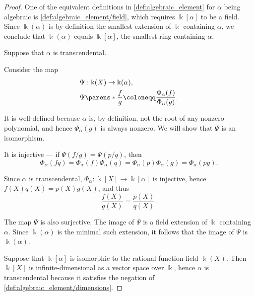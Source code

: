 \begin{proof}
   One of the equivalent definitions in \cref{def:algebraic_element} for \( \alpha \) being algebraic is \cref{def:algebraic_element/field}, which requires \( \Bbbk[\alpha] \) to be a field. Since \( \Bbbk(\alpha) \) is by definition the smallest extension of \( \Bbbk \) containing \( \alpha \), we conclude that \( \Bbbk(\alpha) \) equals \( \Bbbk[\alpha] \), the smallest ring containing \( \alpha \).


  \SufficiencySubProof* Suppose that \( \alpha \) is transcendental.

  Consider the map
  \begin{equation*}
    \begin{aligned}
      &\Psi: \Bbbk(X) \to \Bbbk(\alpha), \\
      &\Psi\parens*{ \frac f g } \coloneqq \frac {\Phi_\alpha(f)} {\Phi_\alpha(g)}.
    \end{aligned}
  \end{equation*}

  It is well-defined because \( \alpha \) is, by definition, not the root of any nonzero polynomial, and hence \( \Phi_\alpha(g) \) is always nonzero. We will show that \( \Psi \) is an isomorphism.

  It is injective --- if \( \Psi(f / g) = \Psi(p / q) \), then
  \begin{equation*}
    \Phi_\alpha(fq) = \Phi_\alpha(f) \Phi_\alpha(q) = \Phi_\alpha(p) \Phi_\alpha(g) = \Phi_\alpha(pg).
  \end{equation*}

  Since \( \alpha \) is transcendental, \( \Phi_\alpha: \Bbbk[X] \to \Bbbk[\alpha] \) is injective, hence \( f(X) q(X) = p(X) g(X) \), and thus
  \begin{equation*}
    \frac {f(X)} {g(X)} = \frac {p(X)} {q(X)}.
  \end{equation*}

  The map \( \Psi \) is also surjective. The image of \( \Psi \) is a field extension of \( \Bbbk \) containing \( \alpha \). Since \( \Bbbk(\alpha) \) is the minimal such extension, it follows that the image of \( \Psi \) is \( \Bbbk(\alpha) \).

  \NecessitySubProof* Suppose that \( \Bbbk[\alpha] \) is isomorphic to the rational function field \( \Bbbk(X) \). Then \( \Bbbk[X] \) is infinite-dimensional as a vector space over \( \Bbbk \), hence \( \alpha \) is transcendental because it satisfies the negation of \cref{def:algebraic_element/dimensions}.
\end{proof}

